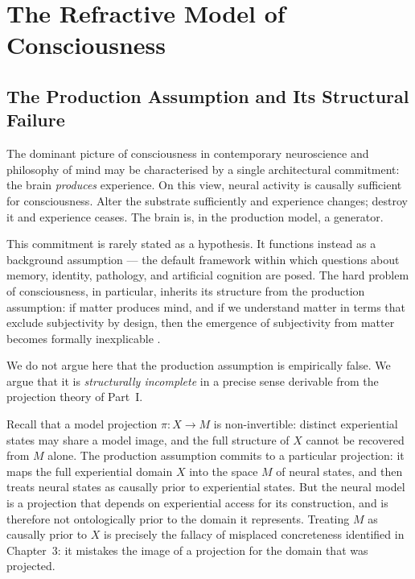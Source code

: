 \documentclass[11pt,openany]{book}
\begin{document}

\chapter{The Refractive Model of Consciousness}
\label{ch:refractive-consciousness}

\section{The Production Assumption and Its Structural Failure}
\label{sec:production-assumption}

The dominant picture of consciousness in contemporary
neuroscience and philosophy of mind may be characterised by
a single architectural commitment: the brain \emph{produces}
experience.  On this view, neural activity is causally
sufficient for consciousness.  Alter the substrate
sufficiently and experience changes; destroy it and
experience ceases.  The brain is, in the production model,
a generator.

This commitment is rarely stated as a hypothesis.  It
functions instead as a background assumption --- the default
framework within which questions about memory, identity,
pathology, and artificial cognition are posed.  The hard
problem of consciousness, in particular, inherits its
structure from the production assumption: if matter produces
mind, and if we understand matter in terms that exclude
subjectivity by design, then the emergence of subjectivity
from matter becomes formally inexplicable
\citep{chalmers1996conscious}.

We do not argue here that the production assumption is
empirically false.  We argue that it is \emph{structurally
incomplete} in a precise sense derivable from the projection
theory of Part~I.

Recall that a model projection $\pi : X \to M$ is
non-invertible: distinct experiential states may share a
model image, and the full structure of $X$ cannot be
recovered from $M$ alone.  The production assumption
commits to a particular projection: it maps the full
experiential domain $X$ into the space $M$ of neural
states, and then treats neural states as causally prior to
experiential states.  But the neural model is a projection
that depends on experiential access for its construction,
and is therefore not ontologically prior to the domain it
represents.  Treating $M$ as causally prior to $X$ is
precisely the fallacy of misplaced concreteness identified
in Chapter~3: it mistakes the image of a projection for
the domain that was projected.
\end{document}
